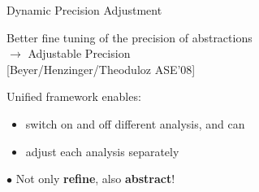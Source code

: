 \begin{frame}{Dynamic Precision Adjustment}
  \begin{minipage}{0.55\textwidth}
    Better fine tuning of the precision of abstractions\\\vspace{-0.3em}
    $\rightarrow$ Adjustable Precision\\
    \textcolor{sosyblue}{\scriptsize{[Beyer/Henzinger/Theoduloz ASE'08]}}

    \bigskip
    Unified framework enables:
    \begin{itemize}
      \item switch on and off different analysis, and can
      \item adjust each analysis separately
    \end{itemize}

  \bigskip
  $\bullet$ Not only \textbf{refine}, also \textbf{abstract}!
  \end{minipage}
  \hspace{1cm}
  \begin{minipage}{0.3\textwidth}{
    }
  \end{minipage}
\end{frame}


